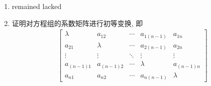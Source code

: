 \begin{enumerate}
    \item %
        {\color{red} remained lacked}
    \item %
        {\heiti 证明}\quad 对方程组的系数矩阵进行初等变换, 即
        \begin{gather*}
            \begin{bmatrix}
                \lambda & a_{12} & \cdots & a_{1(n-1)} & a_{1n} \\
                a_{21} & \lambda & \cdots & a_{2(n-1)} & a_{2n} \\
                \vdots & \vdots & \ddots & \vdots & \vdots \\ 
                a_{(n-1)1} & a_{(n-1)2} & \cdots & \lambda & a_{(n-1)n} \\
                a_{n1} & a_{n2} & \cdots & a_{n(n-1)} & \lambda     
            \end{bmatrix}
        \end{gather*}
\end{enumerate}
% 
